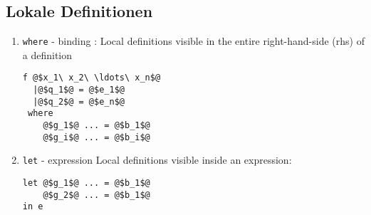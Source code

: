 \documentclass{article}
\newcommand{\Haskell}[1]{\texttt{#1}}
\begin{document}
\subsection{Lokale Definitionen}
\begin{enumerate}
\item \Haskell{where} - binding : Local definitions visible in the entire right-hand-side (rhs) of a definition
\begin{verbatim}
f @$x_1\ x_2\ \ldots\ x_n$@
  |@$q_1$@ = @$e_1$@
  |@$q_2$@ = @$e_n$@
 where 
    @$g_1$@ ... = @$b_1$@
    @$g_i$@ ... = @$b_i$@
\end{verbatim}
\item \Haskell{let} - expression Local definitions visible inside an expression:
\begin{verbatim}
let @$g_1$@ ... = @$b_1$@
    @$g_2$@ ... = @$b_1$@
in e
\end{verbatim}

\end{enumerate}
\end{document}
